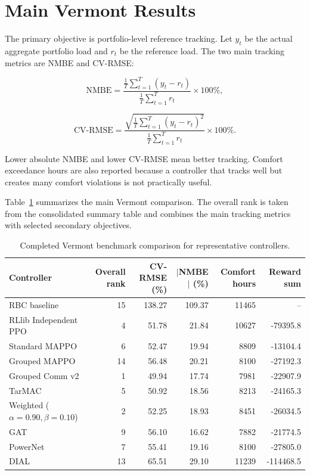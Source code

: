 \section{Main Vermont Results}

The primary objective is portfolio-level reference tracking. Let $y_t$ be the
actual aggregate portfolio load and $r_t$ be the reference load. The two main
tracking metrics are NMBE and CV-RMSE:

\begin{equation}
\mathrm{NMBE} =
\frac{\frac{1}{T}\sum_{t=1}^{T}(y_t-r_t)}
{\frac{1}{T}\sum_{t=1}^{T}r_t} \times 100\%,
\end{equation}

\begin{equation}
\mathrm{CV\mbox{-}RMSE} =
\frac{\sqrt{\frac{1}{T}\sum_{t=1}^{T}(y_t-r_t)^2}}
{\frac{1}{T}\sum_{t=1}^{T}r_t} \times 100\%.
\end{equation}

Lower absolute NMBE and lower CV-RMSE mean better tracking. Comfort exceedance
hours are also reported because a controller that tracks well but creates many
comfort violations is not practically useful.

Table~\ref{tab:vt-main-results} summarizes the main Vermont comparison. The
overall rank is taken from the consolidated summary table and combines the main
tracking metrics with selected secondary objectives.

\begin{table}[h]
\scriptsize
\begin{center}
\begin{tabular}{|l|r|r|r|r|r|}
\hline
Controller & Overall rank & CV-RMSE (\%) & $|$NMBE$|$ (\%) & Comfort hours & Reward sum \\
\hline
RBC baseline & 15 & 138.27 & 109.37 & 11465 & -- \\
RLlib Independent PPO & 4 & 51.78 & 21.84 & 10627 & -79395.8 \\
Standard MAPPO & 6 & 52.47 & 19.94 & 8809 & -13104.4 \\
Grouped MAPPO & 14 & 56.48 & 20.21 & 8100 & -27192.3 \\
Grouped Comm v2 & 1 & 49.94 & 17.74 & 7981 & -22907.9 \\
TarMAC & 5 & 50.92 & 18.56 & 8213 & -24165.3 \\
Weighted ($\alpha=0.90,\beta=0.10$) & 2 & 52.25 & 18.93 & 8451 & -26034.5 \\
GAT & 9 & 56.10 & 16.62 & 7882 & -21774.5 \\
PowerNet & 7 & 55.41 & 19.16 & 8100 & -27805.0 \\
DIAL & 13 & 65.51 & 29.10 & 11239 & -114468.5 \\
\hline
\end{tabular}
\end{center}
\caption{Completed Vermont benchmark comparison for representative controllers.}
\label{tab:vt-main-results}
\end{table}

